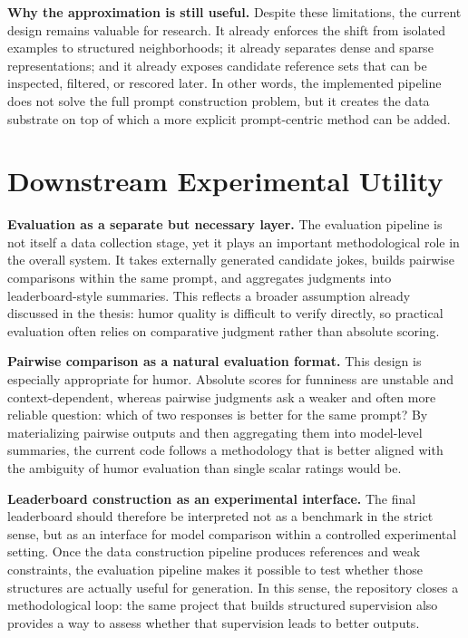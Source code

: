 \documentclass[11pt]{article}
\begin{document}
\textbf{Why the approximation is still useful.} Despite these limitations, the current design remains valuable for research. It already enforces the shift from isolated examples to structured neighborhoods; it already separates dense and sparse representations; and it already exposes candidate reference sets that can be inspected, filtered, or rescored later. In other words, the implemented pipeline does not solve the full prompt construction problem, but it creates the data substrate on top of which a more explicit prompt-centric method can be added.

\section{Downstream Experimental Utility}

\textbf{Evaluation as a separate but necessary layer.} The evaluation pipeline is not itself a data collection stage, yet it plays an important methodological role in the overall system. It takes externally generated candidate jokes, builds pairwise comparisons within the same prompt, and aggregates judgments into leaderboard-style summaries. This reflects a broader assumption already discussed in the thesis: humor quality is difficult to verify directly, so practical evaluation often relies on comparative judgment rather than absolute scoring.

\textbf{Pairwise comparison as a natural evaluation format.} This design is especially appropriate for humor. Absolute scores for funniness are unstable and context-dependent, whereas pairwise judgments ask a weaker and often more reliable question: which of two responses is better for the same prompt? By materializing pairwise outputs and then aggregating them into model-level summaries, the current code follows a methodology that is better aligned with the ambiguity of humor evaluation than single scalar ratings would be.

\textbf{Leaderboard construction as an experimental interface.} The final leaderboard should therefore be interpreted not as a benchmark in the strict sense, but as an interface for model comparison within a controlled experimental setting. Once the data construction pipeline produces references and weak constraints, the evaluation pipeline makes it possible to test whether those structures are actually useful for generation. In this sense, the repository closes a methodological loop: the same project that builds structured supervision also provides a way to assess whether that supervision leads to better outputs.
\end{document}
